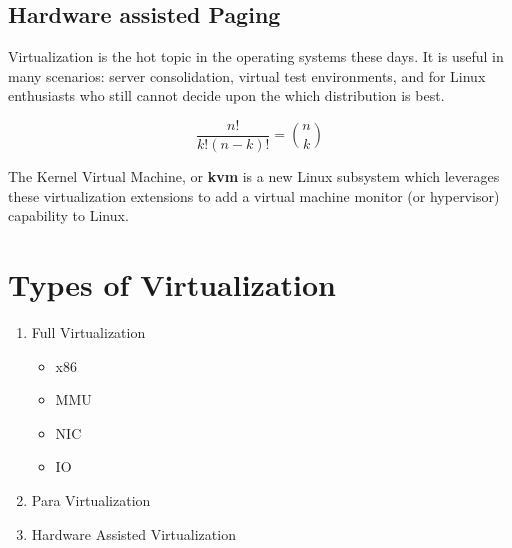 \documentclass[a4paper,twocolumn,10pt]{article}
\begin{document}
   \subsection{Hardware assisted Paging}
    \noindent Virtualization is the hot topic in the operating systems 
  these days. It is useful in many scenarios: server consolidation,
  virtual test environments, and for Linux enthusiasts who
  still cannot decide upon the which distribution is best.
  
   \begin{displaymath}\frac{n!}{k!(n-k)!}=
  \binom{n}{k}
  \end{displaymath}
  
  \noindent The Kernel Virtual Machine, or \textbf{kvm} is a new Linux
  subsystem which leverages these virtualization extensions
  to add a virtual machine monitor\cite{troy} (or hypervisor) capability to Linux.
  
 \section{Types of Virtualization}
 \begin{enumerate}
  \item Full Virtualization
  \begin{itemize}
   \item x86
   \item MMU
   \item NIC
   \item IO
  \end{itemize}
  \item Para Virtualization
  \item Hardware Assisted Virtualization
 \end{enumerate}
 
 
  
\end{document}
